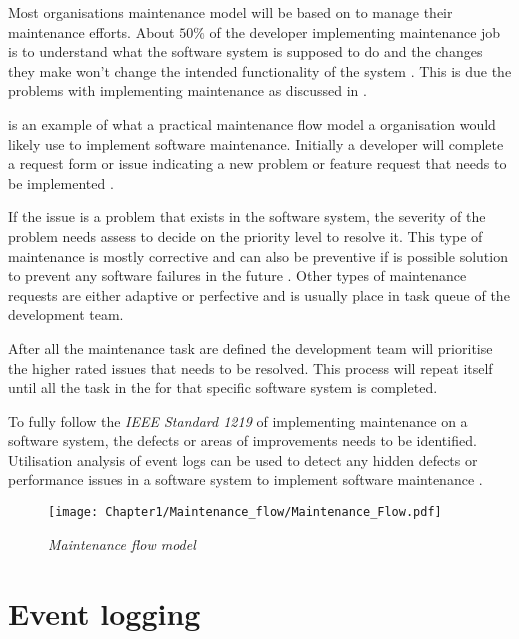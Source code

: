 Most organisations maintenance model will be based on  to manage their maintenance efforts. About $50\%$ of the developer implementing maintenance job is to understand what the software system is supposed to do and the changes they make won't change the intended functionality of the system \cite{Tang2010,Zhuo}. This is due the problems with implementing maintenance as discussed in .\par {} is an example of what a practical maintenance flow model a organisation would likely use to implement software maintenance. Initially a developer will complete a request form or issue indicating a new problem or feature request that needs to be implemented \cite{Tang2010}.\par If the issue is a problem that exists in the software system, the severity of the problem needs assess to decide on the priority level to resolve it. This type of maintenance is mostly corrective and can also be preventive if is possible solution to prevent any software failures in the future \cite{Tang2010}. Other types of maintenance requests are either adaptive or perfective and is usually place in task queue of the development team.\par After all the maintenance task are defined the development team will prioritise the higher rated issues that needs to be resolved. This process will repeat itself until all the task in the for that specific software system is completed.\par To fully follow the \textit{IEEE Standard 1219} of implementing maintenance on a software system, the defects or areas of improvements needs to be identified. Utilisation analysis of event logs can be used to detect any hidden defects or performance issues in a software system to implement software maintenance \cite{Cinque2013, Rong2018a, Levin2019}.

\begin{figure}[!htb] %
	\centering %
	\texttt{[image: Chapter1/Maintenance\_flow/Maintenance\_Flow.pdf]}
	\caption[Maintenance flow model]
	{\textit{Maintenance flow model \cite{Tang2010}}} \label{fig:CH1_MaintenanceFlow}
\end{figure}

\clearpage

\section{Event logging}\label{sec:EventLogging}

